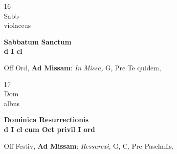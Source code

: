 \documentclass[10pt, openany]{book}
\begin{document}
        \begin{center}
            \begin{minipage}{3.5in}
                \vspace{2em}
                \begin{minipage}{0.5in}
                    {\Huge 16} \\
                    {\normalsize Sabb} \\
                    {\normalsize violaceus}
                \end{minipage}
                \begin{minipage}{3.0in}
                    \textbf{ \large Sabbatum Sanctum \\
                    \textnormal{\normalsize d I cl}} \\ 
                \end{minipage}
                \begin{justify}Off Ord, \textbf{Ad Missam}: \textit{In Missa,} G, Pre Te quidem,   
                \end{justify}
            \end{minipage}
        \end{center}
    
        \begin{center}
            \begin{minipage}{3.5in}
                \vspace{2em}
                \begin{minipage}{0.5in}
                    {\Huge 17} \\
                    {\normalsize Dom} \\
                    {\normalsize albus}
                \end{minipage}
                \begin{minipage}{3.0in}
                    \textbf{ \large Dominica Resurrectionis \\
                    \textnormal{\normalsize d I cl cum Oct privil I ord}} \\ 
                \end{minipage}
                \begin{justify}Off Festiv, \textbf{Ad Missam}: \textit{Ressurexi,} G, C, Pre Paschalis,   
                \end{justify}
            \end{minipage}
        \end{center}
    
\end{document}

